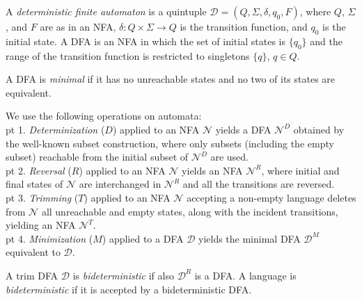 \documentclass[preprint,12pt]{elsarticle}
\newcommand{\Sig}{\Sigma}
\newcommand{\cD}{{\mathcal D}}
\newcommand{\cN}{{\mathcal N}}
\newcommand{\rev}{R}
\newcommand{\deter}{D}
\newcommand{\mini}{M}
\newcommand{\trim}{T}
\begin{document}
A \emph{deterministic finite automaton} is a quintuple 
$\cD=(Q, \Sig, \delta, q_0,F)$, where
$Q$, $\Sig$, and $F$ are as in an NFA, 
$\delta:Q\times \Sig\to Q$ is the transition function, 
and $q_0$ is the initial state. 
A DFA is an NFA in which the set of initial states is $\{q_0\}$ and 
the range of the transition function is restricted to singletons $\{q\}$, $q\in Q$.

A DFA is \emph{minimal} if it has no unreachable states and 
no two of its states are equivalent.



We use the following operations on automata: \\
 pt 1.
\emph{Determinization} ($\deter$) 
applied to an NFA $\cN$ yields a DFA $\cN^{\deter}$ obtained by the well-known subset construction, where only subsets (including the empty subset) reachable from the initial subset of $\cN^\deter$ are used. \\
 pt 2.
 \emph{Reversal} ($\rev$) applied to an NFA $\cN$ yields an NFA $\cN^{\rev}$, where initial and final states of $\cN$ 
are interchanged in $\cN^\rev$ and all the transitions  
are reversed. \\
 pt 3.
\emph{Trimming} ($\trim$) applied to an NFA $\cN$ accepting 
a non-empty language deletes from $\cN$ all unreachable and empty states,
along with the incident transitions, yielding an NFA $\cN^{\trim}$. \\
 pt 4.
\emph{Minimization}  ($\mini$) applied to a DFA $\cD$ yields 
the minimal DFA $\cD^{\mini}$ equivalent to $\cD$.

A trim DFA $\cD$ is \emph{bideterministic} if also $\cD^{\rev}$ is a DFA.
A language is \emph{bideterministic} if it is accepted by a bideterministic 
DFA.
\end{document}
